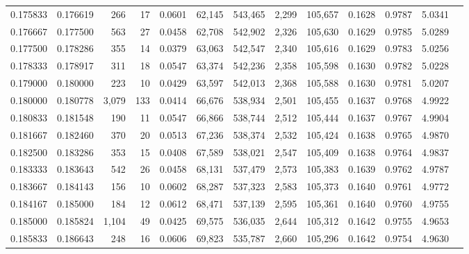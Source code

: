 \begin{tabular}{rrrrrrrrrrrrr}
0.175833 & 0.176619 &   266 &  17 &                                     0.0601 &  62,145 & 543,465 &   2,299 & 105,657 & 0.1628 & 0.9787 & 5.0341 \\
0.176667 & 0.177500 &   563 &  27 &                                     0.0458 &  62,708 & 542,902 &   2,326 & 105,630 & 0.1629 & 0.9785 & 5.0289 \\
0.177500 & 0.178286 &   355 &  14 &                                     0.0379 &  63,063 & 542,547 &   2,340 & 105,616 & 0.1629 & 0.9783 & 5.0256 \\
0.178333 & 0.178917 &   311 &  18 &                                     0.0547 &  63,374 & 542,236 &   2,358 & 105,598 & 0.1630 & 0.9782 & 5.0228 \\
0.179000 & 0.180000 &   223 &  10 &                                     0.0429 &  63,597 & 542,013 &   2,368 & 105,588 & 0.1630 & 0.9781 & 5.0207 \\
0.180000 & 0.180778 & 3,079 & 133 &                                     0.0414 &  66,676 & 538,934 &   2,501 & 105,455 & 0.1637 & 0.9768 & 4.9922 \\
0.180833 & 0.181548 &   190 &  11 &                                     0.0547 &  66,866 & 538,744 &   2,512 & 105,444 & 0.1637 & 0.9767 & 4.9904 \\
0.181667 & 0.182460 &   370 &  20 &                                     0.0513 &  67,236 & 538,374 &   2,532 & 105,424 & 0.1638 & 0.9765 & 4.9870 \\
0.182500 & 0.183286 &   353 &  15 &                                     0.0408 &  67,589 & 538,021 &   2,547 & 105,409 & 0.1638 & 0.9764 & 4.9837 \\
0.183333 & 0.183643 &   542 &  26 &                                     0.0458 &  68,131 & 537,479 &   2,573 & 105,383 & 0.1639 & 0.9762 & 4.9787 \\
0.183667 & 0.184143 &   156 &  10 &                                     0.0602 &  68,287 & 537,323 &   2,583 & 105,373 & 0.1640 & 0.9761 & 4.9772 \\
0.184167 & 0.185000 &   184 &  12 &                                     0.0612 &  68,471 & 537,139 &   2,595 & 105,361 & 0.1640 & 0.9760 & 4.9755 \\
0.185000 & 0.185824 & 1,104 &  49 &                                     0.0425 &  69,575 & 536,035 &   2,644 & 105,312 & 0.1642 & 0.9755 & 4.9653 \\
0.185833 & 0.186643 &   248 &  16 &                                     0.0606 &  69,823 & 535,787 &   2,660 & 105,296 & 0.1642 & 0.9754 & 4.9630 \\

\end{tabular}

